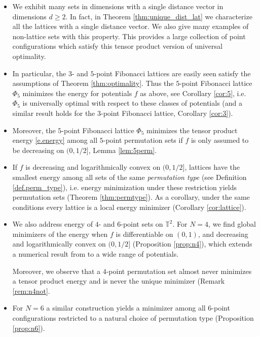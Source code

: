 \documentclass[a4paper,12pt]{article}
\numberwithin{equation}{section}
\theoremstyle{definition}
\begin{document}
\begin{itemize}
(See \S\ref{sec:equispaced} for more details) 
\item We  exhibit many  sets in dimensions with a single distance vector in dimensions $d\ge 2$. In fact, in Theorem \ref{thm:unique_dist_lat} we characterize all the lattices with a single distance vector. We also give many examples of non-lattice sets with this property. This provides a large collection of point configurations which satisfy this tensor  product version of universal optimality. 
\item In particular, the $3$- and $5$-point Fibonacci lattices are easily seen satisfy the assumptions of Theorem \ref{thm:optimality}.  Thus the $5$-point Fibonacci  lattice $\Phi_5$ minimizes the energy for  potentials $f$ as above, see Corollary \ref{cor:5}, i.e. $\Phi_5$ is universally optimal with respect to these  classes of potentials (and a similar result holds for the $3$-point Fibonacci lattice, Corollary \ref{cor:3}). 
\item Moreover, the $5$-point Fibonacci  lattice $\Phi_5$  minimizes the tensor product energy \eqref{e.energy} among all $5$-point permutation sets if $f$ is only assumed to be decreasing  on $(0,1/2]$, Lemma \ref{lem:5perm}. 
\item If $f$ is decreasing and logarithmically convex on $(0,1/2]$, lattices have the smallest energy among all sets of the same {\emph{permutation type}} (see Definition \ref{def.perm_type}), i.e. energy minimization under these restriction  yields permutation sets (Theorem \ref{thm:permtype}). As a corollary, under the same conditions every lattice is a local energy  minimizer (Corollary \ref{cor:lattice}).
\item We also address energy of $4$- and $6$-point sets on  $\mathbb{T}^2$. For $N=4$,  we find  global minimizers of the energy  when $f$ is differentiable on $(0, 1)$, and decreasing and logarithmically convex on $(0,1/2]$ (Proposition \ref{prop:n4}), which extends a numerical result from \cite{HO16} to a wide range of potentials. 

Moreover, we observe that a $4$-point permutation set almost never minimizes a tensor product energy and is never the unique minimizer (Remark \ref{rem:n4not}.

\item For $N=6$ a similar construction yields a minimizer among all $6$-point  configurations restricted to a natural choice of permutation type (Proposition \ref{prop:n6}). 
\end{itemize}
\end{document}
